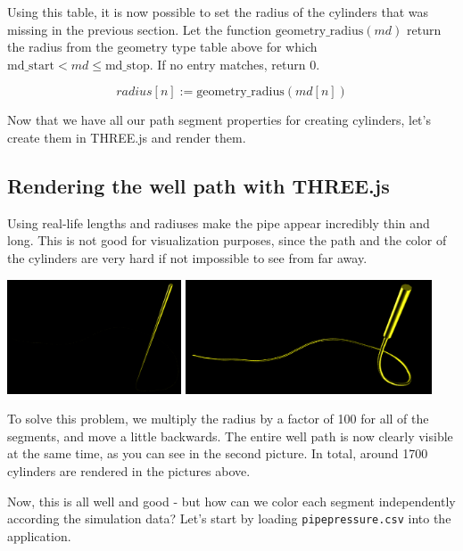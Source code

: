Using this table, it is now possible to set the radius of the cylinders
that was missing in the previous section. Let the function
\(\text{geometry\_radius}(md)\) return the radius from the geometry type
table above for which \(\text{md\_start} < md \leq \text{md\_stop}\). If
no entry matches, return 0.

\[
radius[n] := \text{geometry\_radius}(md[n])
\]

Now that we have all our path segment properties for creating cylinders,
let's create them in THREE.js and render them.

\hypertarget{rendering-the-well-path-with-three.js}{%
\subsection{Rendering the well path with
THREE.js}\label{rendering-the-well-path-with-three.js}}

Using real-life lengths and radiuses make the pipe appear incredibly
thin and long. This is not good for visualization purposes, since the
path and the color of the cylinders are very hard if not impossible to
see from far away.

\includegraphics[width=\textwidth,height=1.33333in]{./thin-path.png}
\includegraphics[width=\textwidth,height=1.33333in]{./thick-path.png}

To solve this problem, we multiply the radius by a factor of 100 for all
of the segments, and move a little backwards. The entire well path is
now clearly visible at the same time, as you can see in the second
picture. In total, around 1700 cylinders are rendered in the pictures
above.

Now, this is all well and good - but how can we color each segment
independently according the simulation data? Let's start by loading
\texttt{pipepressure.csv} into the application.

